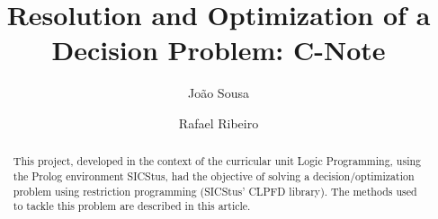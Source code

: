 \documentclass[runningheads]{llncs}
\begin{document}
%
\title{Resolution and Optimization of a Decision Problem: C-Note}
%
%
\author{João Sousa \and Rafael Ribeiro}
%
%
\maketitle              %
%
\begin{abstract}
This project, developed in the context of the curricular unit Logic Programming, using the Prolog environment SICStus, had the objective of solving a decision/optimization problem using restriction programming (SICStus' CLPFD library). The methods used to tackle this problem are described in this article.

\end{abstract}
%
%
%
\end{document}

